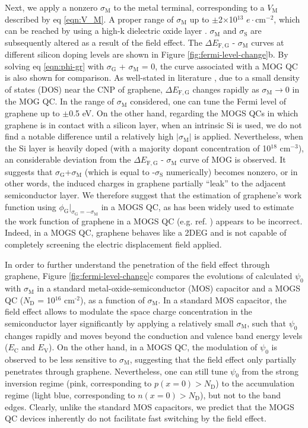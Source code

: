 \documentclass[journal=nalefd]{achemso}
\newcommand*\subs[1]{_{\text{#1}}} %
\newcommand*\sups[1]{^{\text{#1}}} %
\begin{document}
Next, we apply a nonzero $\sigma\subs{M}$ to the metal terminal, corresponding to a $V\subs{M}$ described by eq \ref{eqn:V_M}.
A proper range of $\sigma\subs{M}$ up to $\pm$2$\times$10$^{13}$ $e\cdot$cm$^{-2}$, which can be reached by using a high-k dielectric oxide layer \cite{Das2008Monitoring}.
$\sigma\subs{M}$ and $\sigma\subs{S}$ are subsequently altered as a result of the field effect.
The $\Delta E_{\mathrm {F,G}}$ - $\sigma\subs{M}$ curves at different silicon doping levels are shown in Figure \ref{fig:fermi-level-change}b.
By solving eq \ref{eqn:phi-gr} with $\sigma\subs{G}$ + $\sigma\subs{M}$ = 0, the curve associated with a MOG QC is also shown for comparison.
As well-stated in literature \cite{Neto2009Electron}, due to a small density of states (DOS) near the CNP of graphene, $\Delta E_{\mathrm {F,G}}$ changes rapidly as $\sigma\subs{M}\to0$ in the MOG QC.
In the range of $\sigma\subs{M}$ considered, one can tune the Fermi level of graphene up to $\pm$0.5 eV.
On the other hand, regarding the MOGS QCs in which graphene is in contact with a silicon layer, when an intrinsic Si is used, we do not find a notable difference until a relatively high $|\sigma\subs{M}|$ is applied. 
Nevertheless, when the Si layer is heavily doped (with a majority dopant concentration of 10$^{18}$ cm$^{-3}$), an considerable deviation from the $\Delta E_{\mathrm {F,G}}$ - $\sigma\subs{M}$ curve of MOG is observed.
It suggests that $\sigma\subs{G}$+$\sigma\subs{M}$ (which is equal to -$\sigma\subs{S}$ numerically) becomes nonzero, or in other words, the induced charges in graphene partially ``leak'' to the adjacent semiconductor layer.
We therefore suggest that the estimation of graphene's work function using $\phi\subs{G}|_{\sigma\subs{G}=-\sigma\subs{M}}$ in a MOGS QC, as has been widely used to estimate the work function of graphene in a MOGS QC (e.g. ref. ) appears to be incorrect.
Indeed, in a MOGS QC, graphene behaves like a 2DEG and is not capable of completely screening the electric displacement field applied.

In order to further understand the penetration of the field effect through graphene, Figure \ref{fig:fermi-level-change}c compares the evolutions of calculated $\psi_0$ with $\sigma\subs{M}$ in a standard metal-oxide-semiconductor (MOS) capacitor and a MOGS QC ($N\subs{D}$ = 10$\sups{16}$ cm$\sups{-2}$), as a function of $\sigma\subs{M}$.
In a standard MOS capacitor, the field effect allows to modulate the space charge concentration in the semiconductor layer significantly by applying a relatively small $\sigma\subs{M}$, such that $\psi_{0}$ changes rapidly and moves beyond the conduction and valence band energy levels ($E\subs{C}$ and $E\subs{V}$).
On the other hand, in a MOGS QC, the modulation of $\psi_0$ is observed to be less sensitive to $\sigma\subs{M}$, suggesting that the field effect only partially penetrates through graphene.
Nevertheless, one can still tune $\psi_0$ from the strong inversion regime (pink, corresponding to $p(x = 0) > N\subs{D}$) to the accumulation regime (light blue, corresponding to $n(x = 0) > N\subs{D}$), but not to the band edges. 
Clearly, unlike the standard MOS capacitors, we predict that the MOGS QC devices inherently do not facilitate fast switching by the field effect.
\end{document}
